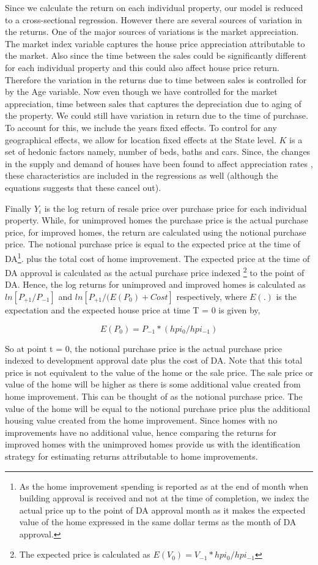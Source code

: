 \documentclass{article}
\begin{document}
Since we calculate the return on each individual property, our model is reduced to a cross-sectional regression. However there are several sources of variation in the returns. One of the major sources of variations is the market appreciation. The market index variable captures the house price appreciation attributable to the market. Also since the time between the sales could be significantly different for each individual property and this could also affect house price return. Therefore the variation in the returns due to time between sales is controlled for by the Age variable. Now even though we have controlled for the market appreciation, time between sales that captures the depreciation due to aging of the property. We could still have variation in return due to the time of purchase. To account for this, we include the years fixed effects. To control for any geographical effects, we allow for location fixed effects at the State level. $K$ is a set of hedonic factors namely, number of beds, baths and cars. Since, the changes in the supply and demand of houses have been found to affect appreciation rates \citep{kiel1995effect}, these characteristics are included in the regressions as well (although the equations suggests that these cancel out).

Finally $Y_i$ is the log return of resale price over purchase price for each individual property. While, for unimproved homes the purchase price is the actual purchase price, for improved homes, the return are calculated using the notional purchase price. The notional purchase price is equal to the expected price at the time of DA\footnote{As the home improvement spending is reported as at the end of month when building approval is received and not at the time of completion, we index the actual price up to the point of DA approval month as it makes the expected value of the home expressed in the same dollar terms as the month of DA approval.}. plus the total cost of home improvement. The expected price at the time of DA approval is calculated as the actual purchase price indexed \footnote{The expected price is calculated as $E(V_0) = V_{-1} * hpi_0 / hpi_{-1}$} to the point of DA. Hence, the log returns for unimproved and improved homes is calculated as $ln[P_{+1}/P_{-1}]$ and $ln[P_{+1}/(E(P_{0})+ Cost]$ respectively, where $E(.)$ is the expectation and the expected house price at time T = 0 is given by,

$$ E(P_0) = P_{-1} * (hpi_0 / hpi_{-1}) $$ 

So at point t = 0, the notional purchase price is the actual purchase price indexed to development approval date plus the cost of DA. Note that this total price is not equivalent to the value of the home or the sale price. The sale price or value of the home will be higher as there is some additional value created from home improvement. This can be thought of as the notional purchase price. The value of the home will be equal to the notional purchase price plus the additional housing value created from the home improvement. Since homes with no improvements have no additional value, hence comparing the returns for improved homes with the unimproved homes provide us with the identification strategy for estimating returns attributable to home improvements. 
\end{document}
